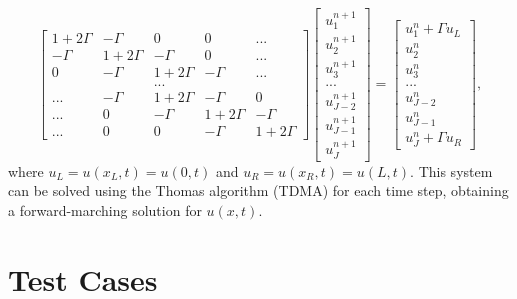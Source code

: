 \documentclass[11pt]{article} %
\begin{document}
\[
\begin{bmatrix}
1+2\Gamma & -\Gamma & 0 & 0 &...\\
-\Gamma & 1+2\Gamma & -\Gamma & 0 &...\\
0 & -\Gamma & 1+2\Gamma & -\Gamma & ...\\
 & & ... & & \\
...& -\Gamma & 1+2\Gamma & -\Gamma & 0\\
...& 0 & -\Gamma & 1+2\Gamma & -\Gamma\\
...& 0 & 0 & -\Gamma & 1+2\Gamma
\end{bmatrix}
\begin{bmatrix}
u^{n+1}_1 \\ u^{n+1}_2 \\ u^{n+1}_3 \\ ... \\ u^{n+1}_{J-2} \\ u^{n+1}_{J-1} \\ u^{n+1}_{J}
\end{bmatrix}
=
\begin{bmatrix}
u^n_1+\Gamma u_L \\ u^n_2 \\ u^n_3 \\ ... \\ u^n_{J-2} \\ u^n_{J-1} \\ u^n_J  +\Gamma u_R
\end{bmatrix},
\]
where $u_L=u(x_L,t)=u(0,t)$ and $u_R=u(x_R,t)=u(L,t)$.  This system can be solved using the Thomas algorithm (TDMA) for each time step, obtaining a forward-marching solution for $u(x,t)$.


\section{Test Cases}
\end{document}

